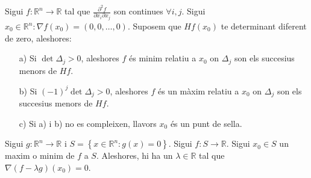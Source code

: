 \documentclass[../main.tex]{subfiles}
\begin{document}
    \begin{teorema}
        Sigui $f: \mathbb{R}^n \to \mathbb{R}$ tal que $\frac{\partial^2f}{\partial x_i \partial x_j}$
        son continues $ \forall i,j$. Sigui $x_0 \in \mathbb{R}^n: \nabla f\left(x_0\right) = \left(0, 0, \dots, 0\right)$.
        Suposem que $Hf\left(x_0\right)$ te determinant diferent de zero, aleshores:
        \begin{itemize}
            \item[a)] Si $\det{\Delta_j} > 0$, aleshores $f$ és minim relatiu a $x_0$ on $\Delta_j$
            son els succesius menors de $Hf$.
            \item[b)] Si $(-1)^j\det{\Delta_j} > 0$, aleshores $f$ és un màxim relatiu a $x_0$ on $\Delta_j$
            son els succesius menors de $Hf$.
            \item[c)] Si a) i b) no es compleixen, llavors $x_0$ és un punt de sella.
        \end{itemize}
    \end{teorema}
    \begin{teorema}
        Sigui $g: \mathbb{R}^n \to \mathbb{R}$ i $S = \left\{x\in\mathbb{R}^n: g\left(x\right)=0\right\}$.
        Sigui $f: S \to \mathbb{R}$. Sigui $x_0 \in S$ un maxim o minim de $f$ a $S$. Aleshores, hi
        ha un $\lambda \in \mathbb{R}$ tal que $\nabla \left(f - \lambda g\right) \left(x_0\right) = 0$.
    \end{teorema}
\end{document}

